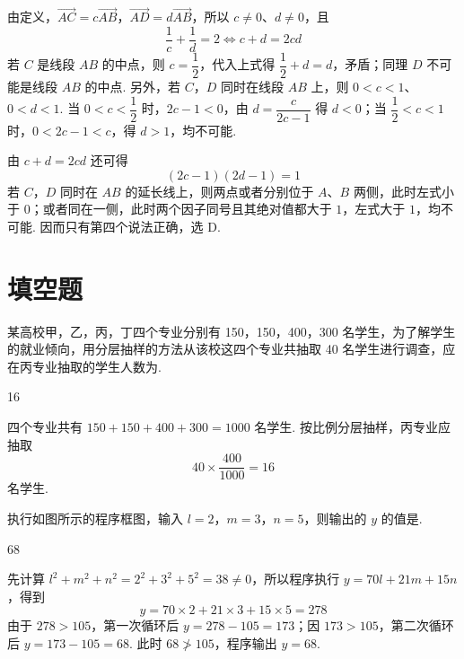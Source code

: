 \begin{solution}
由定义，\(\overrightarrow{AC}=c\overrightarrow{AB}\)，\(\overrightarrow{AD}=d\overrightarrow{AB}\)，所以 \(c\neq0\)、\(d\neq0\)，且
\[
\frac1c+\frac1d=2\iff c+d=2cd
\]
若 \(C\) 是线段 \(AB\) 的中点，则 \(c=\dfrac12\)，代入上式得 \(\dfrac12+d=d\)，矛盾；同理 \(D\) 不可能是线段 \(AB\) 的中点. 另外，若 \(C\)，\(D\) 同时在线段 \(AB\) 上，则 \(0<c<1\)、\(0<d<1\). 当 \(0<c<\dfrac12\) 时，\(2c-1<0\)，由 \(d=\dfrac{c}{2c-1}\) 得 \(d<0\)；当 \(\dfrac12<c<1\) 时，\(0<2c-1<c\)，得 \(d>1\)，均不可能.

由 \(c+d=2cd\) 还可得
\[
(2c-1)(2d-1)=1
\]
若 \(C\)，\(D\) 同时在 \(AB\) 的延长线上，则两点或者分别位于 \(A\)、\(B\) 两侧，此时左式小于 \(0\)；或者同在一侧，此时两个因子同号且其绝对值都大于 \(1\)，左式大于 \(1\)，均不可能. 因而只有第四个说法正确，选 D.
\end{solution}

\section{填空题}

\begin{problem}
某高校甲，乙，丙，丁四个专业分别有 150，150，400，300 名学生，为了解学生的就业倾向，用分层抽样的方法从该校这四个专业共抽取 40 名学生进行调查，应在丙专业抽取的学生人数为\fillinblank{}.
\end{problem}

\begin{answer}
16
\end{answer}

\begin{solution}
四个专业共有 \(150+150+400+300=1000\) 名学生. 按比例分层抽样，丙专业应抽取
\[
40\times\frac{400}{1000}=16
\]
名学生.
\end{solution}

\begin{problem}
执行如图所示的程序框图，输入 \(l = 2\)，\(m = 3\)，\(n = 5\)，则输出的 \(y\) 的值是\fillinblank{}.

\end{problem}

\begin{answer}
68
\end{answer}

\begin{solution}
先计算 \(l^2+m^2+n^2=2^2+3^2+5^2=38\neq0\)，所以程序执行 \(y=70l+21m+15n\)，得到
\[
y=70\times2+21\times3+15\times5=278
\]
由于 \(278>105\)，第一次循环后 \(y=278-105=173\)；因 \(173>105\)，第二次循环后 \(y=173-105=68\). 此时 \(68\not>105\)，程序输出 \(y=68\).
\end{solution}

